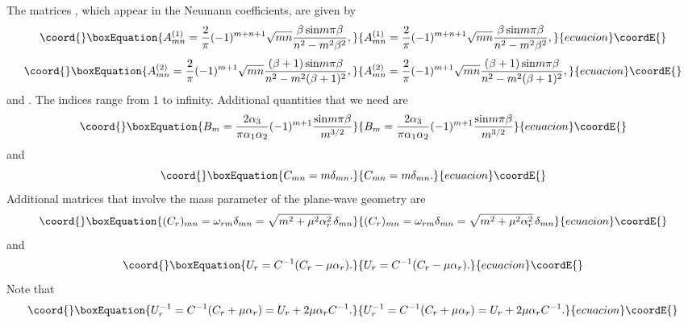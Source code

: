 \documentclass[a4paper,12pt]{article}
\begin{document}
The matrices \coordHE{}, which appear in the Neumann
coefficients, are given by
\begin{equation}\coord{}\boxEquation{
A^{(1)}_{mn} = {2 \over \pi} (-1)^{m+n+1}  \sqrt{m n} {\beta \,
{\rm sin} m \pi \beta \over n^2 - m^2 \beta^2},
}{
A^{(1)}_{mn} = {2 \over \pi} (-1)^{m+n+1}  \sqrt{m n} {\beta \,
{\rm sin} m \pi \beta \over n^2 - m^2 \beta^2},
}{ecuacion}\coordE{}\end{equation}
\begin{equation}\coord{}\boxEquation{
A^{(2)}_{mn} = {2 \over \pi} (-1)^{m+1}  \sqrt{m n} {(\beta +1)\,
{\rm sin} m \pi \beta \over n^2 - m^2 (\beta +1)^2},
}{
A^{(2)}_{mn} = {2 \over \pi} (-1)^{m+1}  \sqrt{m n} {(\beta +1)\,
{\rm sin} m \pi \beta \over n^2 - m^2 (\beta +1)^2},
}{ecuacion}\coordE{}\end{equation}
and \coordHE{}. The indices \coordHE{} range from 1
to infinity. Additional quantities that we need are
\begin{equation}\coord{}\boxEquation{
B_m = {2 \alpha_3 \over \pi \alpha_1 \alpha_2} (-1)^{m+1} { {\rm
sin} m \pi \beta \over m^{3/2} }
}{
B_m = {2 \alpha_3 \over \pi \alpha_1 \alpha_2} (-1)^{m+1} { {\rm
sin} m \pi \beta \over m^{3/2} }
}{ecuacion}\coordE{}\end{equation}
and
\begin{equation}\coord{}\boxEquation{
C_{mn} = m \delta_{mn}.
}{
C_{mn} = m \delta_{mn}.
}{ecuacion}\coordE{}\end{equation}
Additional matrices that involve the mass parameter \myHighlight{$\mu$}\coordHE{} of the
plane-wave geometry are
\begin{equation}\coord{}\boxEquation{
(C_r)_{mn} = \omega_{rm} \delta_{mn} = \sqrt{m^2 + \mu^2
\alpha_r^2}\, \delta_{mn}
}{
(C_r)_{mn} = \omega_{rm} \delta_{mn} = \sqrt{m^2 + \mu^2
\alpha_r^2}\, \delta_{mn}
}{ecuacion}\coordE{}\end{equation}
and
\begin{equation}\coord{}\boxEquation{
U_r = C^{-1} (C_r -\mu \alpha_r).
}{
U_r = C^{-1} (C_r -\mu \alpha_r).
}{ecuacion}\coordE{}\end{equation}
Note that
\begin{equation}\coord{}\boxEquation{ \label{Uformula}
U_r^{-1} = C^{-1} (C_r + \mu \alpha_r) = U_r + 2 \mu \alpha_r
C^{-1}.
}{ U_r^{-1} = C^{-1} (C_r + \mu \alpha_r) = U_r + 2 \mu \alpha_r
C^{-1}.
}{ecuacion}\coordE{}\end{equation}
\end{document}
